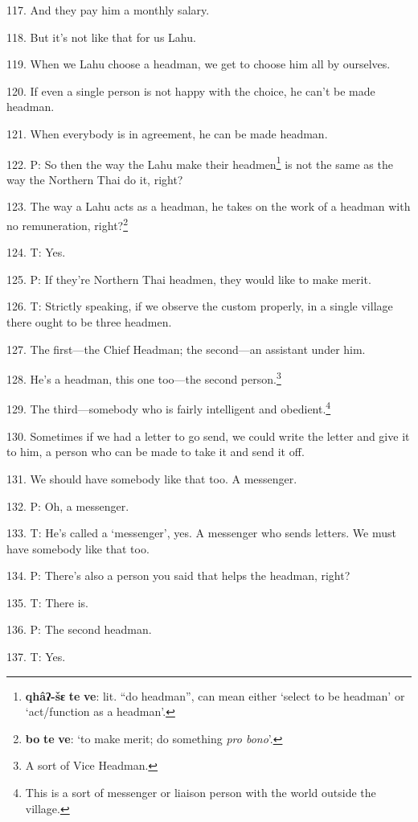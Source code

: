 117. And they pay him a monthly salary.

118. But it's not like that for us Lahu.

119. When we Lahu choose a headman, we get to choose him all by ourselves.

120. If even a single person is not happy with the choice, he can't be made headman.

121. When everybody is in agreement, he can be made headman.

122. P: So then the way the Lahu make their headmen\footnote{\textbf{qhâʔ-šɛ} \textbf{te} \textbf{ve}: lit. ``do headman'', can mean either `select to be headman' or `act/function as a headman'.} is not the same as the
way the Northern Thai do it, right?

123. The way a Lahu acts as a headman, he takes on the work of a headman with no
remuneration, right?\footnote{\textbf{bo} \textbf{te} \textbf{ve}: `to make merit; do something \textit{pro bono}'.}

124. T: Yes.

125. P: If they're Northern Thai headmen, they would like to make merit.

126. T: Strictly speaking, if we observe the custom properly, in a single village
there ought to be three headmen.

127. The first---the Chief Headman; the second---an assistant under him.

128. He's a headman, this one too---the second person.\footnote{A sort of Vice Headman.}

129. The third---somebody who is fairly intelligent and obedient.\footnote{This is a sort of messenger or liaison person with the world outside the village.}

130. Sometimes if we had a letter to go send, we could write the letter and give
it to him, a person who can be made to take it and send it off.

131. We should have somebody like that too. A messenger.

132. P: Oh, a messenger.

133. T: He's called a `messenger', yes. A messenger who sends letters. We must
have somebody like that too.

134. P: There's also a person you said that helps the headman, right?

135. T: There is.

136. P: The second headman.

137. T: Yes.


